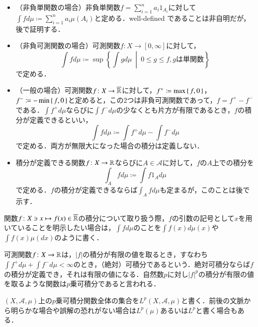 \begin{defi}[積分の定義]
\leavevmode
\begin{itemize}
\item （非負単関数の場合）非負単関数$f = \sum_{i=1}^n a_i 1_{A_i}$に対して$\int f d\mu \coloneqq \sum_{i=1}^n a_i \mu(A_i)$と定める．well-defined であることは非自明だが，後で証明する．

\item （非負可測関数の場合）可測関数$f \colon X \to [0,\infty]$に対して，
\begin{equation}
\int f d \mu \coloneqq \sup \left\{ \int g d \mu \ \middle|  \ 0 \leq g \leq f, g {は単関数} \right\}
\end{equation}で定める．

\item （一般の場合）可測関数$f \colon X \to \overline{\mathbb{R}}$に対して，$f^+ \coloneqq \max\set{f,0}$，$f^- \coloneqq - \min\set{f,0}$と定めると，この2つは非負可測関数であって，$f = f^+ - f^-$である．$\int f^+ d \mu$ならびに$\int f^- d \mu$の少なくとも片方が有限であるとき，$f$の積分が定義できるといい，
\begin{equation}
\int f d \mu \coloneqq \int f^+ d \mu - \int f^- d \mu
\end{equation}で定める．両方が無限大になった場合の積分は定義しない．
\item 積分が定義できる関数$f \colon X \to \mathbb{R}$ならびに$A \in \mathcal{A}$に対して，$f$の$A$上での積分を
\begin{equation}
\int_A f d \mu \coloneqq \int f1_A d\mu
\end{equation}で定める．$f$の積分が定義できるならば$\int_A f d\mu$も定まるが，このことは後で示す．
\end{itemize}
関数$f \colon X \ni x \mapsto f(x) \in \overline{\mathbb{R}}$の積分について取り扱う際，$f$の引数の記号として$x$を用いていることを明示したい場合は，$\int f d \mu$のことを$\int f(x) d\mu(x)$や$\int f(x) \mu(dx)$のように書く．
\end{defi}

\begin{defi}
可測関数$f\colon X \to \mathbb{R}$は，$|f|$の積分が有限の値を取るとき，すなわち$\int f^+ d\mu + \int f^- d\mu < \infty$のとき，（絶対）可積分であるという．絶対可積分ならば$f$の積分が定義でき，それは有限の値になる．自然数$p$に対し$|f|^p$の積分が有限の値を取るような関数は$p$乗可積分であると言われる．

$(X,\mathcal{A},\mu)$上の$p$乗可積分関数全体の集合を$L^p(X,\mathcal{A},\mu)$と書く．前後の文脈から明らかな場合や誤解の恐れがない場合は$L^p(\mu)$あるいは$L^p$と書く場合もある．
\end{defi}

